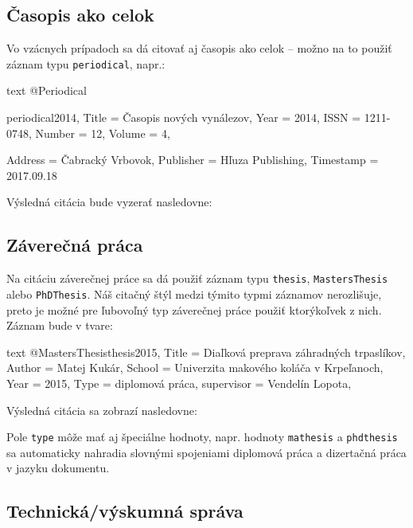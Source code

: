 \noindent[X] 

\subsection{Časopis ako celok}

Vo vzácnych prípadoch sa dá citovať aj časopis ako celok -- možno na to použiť záznam typu \texttt{periodical}, napr.:
\begin{inlinecode}{text}
@Periodical{periodical2014,
  Title                    = {Časopis nových vynálezov},
  Year                     = {2014},
  ISSN                     = {1211-0748},
  Number                   = {12},
  Volume                   = {4},

  Address                  = {Čabracký Vrbovok},
  Publisher                = {Hľuza Publishing},
  Timestamp                = {2017.09.18}
}
\end{inlinecode}
Výsledná citácia bude vyzerať nasledovne:

\noindent[X] 

\subsection{Záverečná práca}

Na citáciu záverečnej práce sa dá použiť záznam typu \texttt{thesis}, \texttt{MastersThesis} alebo \texttt{PhDThesis}. Náš citačný štýl medzi týmito typmi záznamov nerozlišuje, preto je možné pre ľubovoľný typ záverečnej práce použiť ktorýkoľvek z nich. Záznam bude v tvare:
\begin{inlinecode}{text}
@MastersThesis{thesis2015,
  Title                    = {Diaľková preprava záhradných trpaslíkov},
  Author                   = {Matej Kukár},
  School                   = {Univerzita makového koláča v Krpeľanoch},
  Year                     = {2015},
  Type                     = {diplomová práca},
  supervisor               = {Vendelín Lopota},
}
\end{inlinecode}

Výsledná citácia sa zobrazí nasledovne:

\noindent[X] 

Pole \texttt{type} môže mať aj špeciálne hodnoty, napr. hodnoty \texttt{mathesis} a \texttt{phdthesis} sa automaticky nahradia slovnými spojeniami diplomová práca a dizertačná práca v jazyku dokumentu.

\subsection{Technická/výskumná správa}


